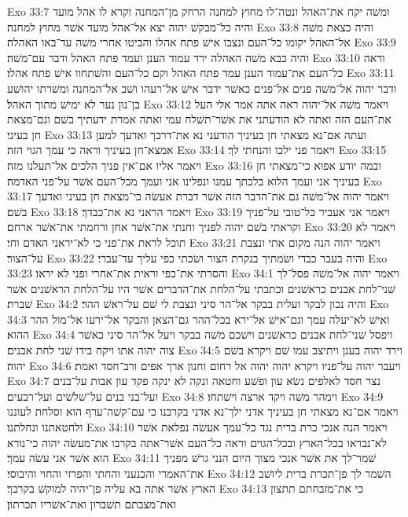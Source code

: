 Exo 33:7  ומשׁה יקח את־האהל ונטה־לו מחוץ למחנה הרחק מן־המחנה וקרא לו אהל מועד והיה כל־מבקשׁ יהוה יצא אל־אהל מועד אשׁר מחוץ למחנה׃
Exo 33:8  והיה כצאת משׁה אל־האהל יקומו כל־העם ונצבו אישׁ פתח אהלו והביטו אחרי משׁה עד־באו האהלה׃
Exo 33:9  והיה כבא משׁה האהלה ירד עמוד הענן ועמד פתח האהל ודבר עם־משׁה׃
Exo 33:10  וראה כל־העם את־עמוד הענן עמד פתח האהל וקם כל־העם והשׁתחוו אישׁ פתח אהלו׃
Exo 33:11  ודבר יהוה אל־משׁה פנים אל־פנים כאשׁר ידבר אישׁ אל־רעהו ושׁב אל־המחנה ומשׁרתו יהושׁע בן־נון נער לא ימישׁ מתוך האהל׃
Exo 33:12  ויאמר משׁה אל־יהוה ראה אתה אמר אלי העל את־העם הזה ואתה לא הודעתני את אשׁר־תשׁלח עמי ואתה אמרת ידעתיך בשׁם וגם־מצאת חן בעיני׃
Exo 33:13  ועתה אם־נא מצאתי חן בעיניך הודעני נא את־דרכך ואדעך למען אמצא־חן בעיניך וראה כי עמך הגוי הזה׃
Exo 33:14  ויאמר פני ילכו והנחתי לך׃
Exo 33:15  ויאמר אליו אם־אין פניך הלכים אל־תעלנו מזה׃
Exo 33:16  ובמה יודע אפוא כי־מצאתי חן בעיניך אני ועמך הלוא בלכתך עמנו ונפלינו אני ועמך מכל־העם אשׁר על־פני האדמה׃
Exo 33:17  ויאמר יהוה אל־משׁה גם את־הדבר הזה אשׁר דברת אעשׂה כי־מצאת חן בעיני ואדעך בשׁם׃
Exo 33:18  ויאמר הראני נא את־כבדך׃
Exo 33:19  ויאמר אני אעביר כל־טובי על־פניך וקראתי בשׁם יהוה לפניך וחנתי את־אשׁר אחן ורחמתי את־אשׁר ארחם׃
Exo 33:20  ויאמר לא תוכל לראת את־פני כי לא־יראני האדם וחי׃
Exo 33:21  ויאמר יהוה הנה מקום אתי ונצבת על־הצור׃
Exo 33:22  והיה בעבר כבדי ושׂמתיך בנקרת הצור ושׂכתי כפי עליך עד־עברי׃
Exo 33:23  והסרתי את־כפי וראית את־אחרי ופני לא יראו׃
Exo 34:1  ויאמר יהוה אל־משׁה פסל־לך שׁני־לחת אבנים כראשׁנים וכתבתי על־הלחת את־הדברים אשׁר היו על־הלחת הראשׁנים אשׁר שׁברת׃
Exo 34:2  והיה נכון לבקר ועלית בבקר אל־הר סיני ונצבת לי שׁם על־ראשׁ ההר׃
Exo 34:3  ואישׁ לא־יעלה עמך וגם־אישׁ אל־ירא בכל־ההר גם־הצאן והבקר אל־ירעו אל־מול ההר ההוא׃
Exo 34:4  ויפסל שׁני־לחת אבנים כראשׁנים וישׁכם משׁה בבקר ויעל אל־הר סיני כאשׁר צוה יהוה אתו ויקח בידו שׁני לחת אבנים׃
Exo 34:5  וירד יהוה בענן ויתיצב עמו שׁם ויקרא בשׁם יהוה׃
Exo 34:6  ויעבר יהוה על־פניו ויקרא יהוה יהוה אל רחום וחנון ארך אפים ורב־חסד ואמת׃
Exo 34:7  נצר חסד לאלפים נשׂא עון ופשׁע וחטאה ונקה לא ינקה פקד עון אבות על־בנים ועל־בני בנים על־שׁלשׁים ועל־רבעים׃
Exo 34:8  וימהר משׁה ויקד ארצה וישׁתחו׃
Exo 34:9  ויאמר אם־נא מצאתי חן בעיניך אדני ילך־נא אדני בקרבנו כי עם־קשׁה־ערף הוא וסלחת לעוננו ולחטאתנו ונחלתנו׃
Exo 34:10  ויאמר הנה אנכי כרת ברית נגד כל־עמך אעשׂה נפלאת אשׁר לא־נבראו בכל־הארץ ובכל־הגוים וראה כל־העם אשׁר־אתה בקרבו את־מעשׂה יהוה כי־נורא הוא אשׁר אני עשׂה עמך׃
Exo 34:11  שׁמר־לך את אשׁר אנכי מצוך היום הנני גרשׁ מפניך את־האמרי והכנעני והחתי והפרזי והחוי והיבוסי׃
Exo 34:12  השׁמר לך פן־תכרת ברית ליושׁב הארץ אשׁר אתה בא עליה פן־יהיה למוקשׁ בקרבך׃
Exo 34:13  כי את־מזבחתם תתצון ואת־מצבתם תשׁברון ואת־אשׁריו תכרתון׃
